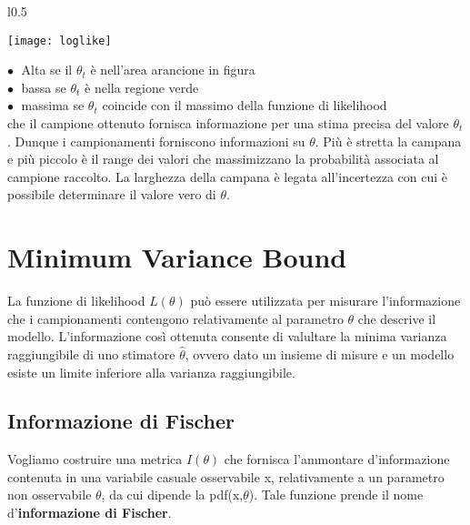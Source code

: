 \documentclass[11pt,a4paper]{book}
\begin{document}
\begin{wrapfigure}{l}{0.5 \textwidth}

\vspace{-10pt}
\centering
\texttt{[image: loglike]}	

\end{wrapfigure}

\noindent $\bullet \;$  Alta se il $\theta_{t}$  \`{e} nell'area arancione in figura \\
\noindent $\bullet \;$ bassa se $\theta_{t}$ \`{e} nella regione verde \\
\noindent $\bullet \;$ massima se $\theta_{t}$ coincide con il massimo della funzione di likelihood \\
 
\noindent che il campione ottenuto fornisca informazione per una stima precisa del valore $\theta_t$. Dunque i campionamenti forniscono informazioni su $\theta$. Pi\`{u} \`{e} stretta la campana e pi\`{u} piccolo \`{e} il range dei valori che massimizzano la probabilit\`{a} associata al campione raccolto. La larghezza della campana \`{e} legata all'incertezza con cui \`{e} possibile determinare il valore vero di $\theta$.
\newline



\section{Minimum Variance Bound}

La funzione di likelihood $L(\theta)$ pu\`{o} essere utilizzata per misurare l'informazione che i campionamenti contengono relativamente al parametro $\theta$ che descrive il modello. L'informazione cos\`{i} ottenuta consente di valultare la minima varianza  raggiungibile di uno stimatore  $\hat{\theta}$, ovvero dato un insieme di misure e un modello  esiste un limite inferiore  alla varianza raggiungibile.

\subsection{Informazione di Fischer}

Vogliamo costruire una metrica $I ( \theta)$ che fornisca l'ammontare d'informazione contenuta in una variabile casuale osservabile x, relativamente a un parametro non osservabile $\theta$, da cui dipende la pdf(x,$ \underline{\theta}$). Tale funzione  prende il nome d'\textbf{informazione di Fischer}.
\end{document}
